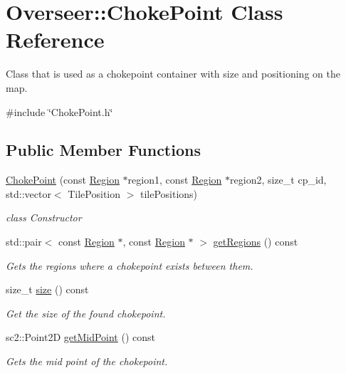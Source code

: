 \hypertarget{classOverseer_1_1ChokePoint}{}\section{Overseer\+:\+:Choke\+Point Class Reference}
\label{classOverseer_1_1ChokePoint}


Class that is used as a chokepoint container with size and positioning on the map.  




{\ttfamily \#include \char`\"{}Choke\+Point.\+h\char`\"{}}

\subsection*{Public Member Functions}
\begin{DoxyCompactItemize}
\item 
\hyperlink{classOverseer_1_1ChokePoint_a9959874fcd9bb54b08378e60ab0a1062}{Choke\+Point} (const \hyperlink{classOverseer_1_1Region}{Region} $\ast$region1, const \hyperlink{classOverseer_1_1Region}{Region} $\ast$region2, size\+\_\+t cp\+\_\+id, std\+::vector$<$ Tile\+Position $>$ tile\+Positions)
\begin{DoxyCompactList}\small\item\em class Constructor \end{DoxyCompactList}\item 
std\+::pair$<$ const \hyperlink{classOverseer_1_1Region}{Region} $\ast$, const \hyperlink{classOverseer_1_1Region}{Region} $\ast$ $>$ \hyperlink{classOverseer_1_1ChokePoint_a205129078ae22b4ee04d4a0f74348acc}{get\+Regions} () const
\begin{DoxyCompactList}\small\item\em Gets the regions where a chokepoint exists between them. \end{DoxyCompactList}\item 
size\+\_\+t \hyperlink{classOverseer_1_1ChokePoint_a33391bda0a2a84efb0114dce77d836ff}{size} () const
\begin{DoxyCompactList}\small\item\em Get the size of the found chokepoint. \end{DoxyCompactList}\item 
sc2\+::\+Point2D \hyperlink{classOverseer_1_1ChokePoint_acaaffce20deb76fb67190c34dd4d6e0f}{get\+Mid\+Point} () const
\begin{DoxyCompactList}\small\item\em Gets the mid point of the chokepoint. \end{DoxyCompactList}\item 

\end{DoxyCompactItemize}
